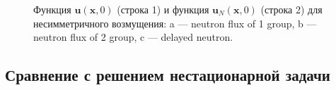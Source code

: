 \documentclass[authoryear]{elsarticle}
\begin{document}
\begin{figure}[!h]
\begin{center}
\begin{minipage}{0.3\linewidth}
 \\
\end{minipage}

\begin{minipage}{0.051\linewidth}
\center{ } \\
\end{minipage}
\hfill
\begin{minipage}{0.3\linewidth}
 \\
\end{minipage}
\hfill
\begin{minipage}{0.3\linewidth}
 \\
\end{minipage}
\hfill
\begin{minipage}{0.3\linewidth}
 \\
\end{minipage}
\hfill

\caption{Функция $\bm u(\bm x, 0)$ (строка 1) и функция  $\bm u_N(\bm x, 0)$ (строка 2) для несимметричного возмущения:
a --- neutron flux of 1 group, b --- neutron flux of 2 group, c --- delayed neutron.}
\label{fig:13}
  \end{center}
\end{figure}

\subsection{Сравнение с решением нестационарной задачи} 
\end{document}
